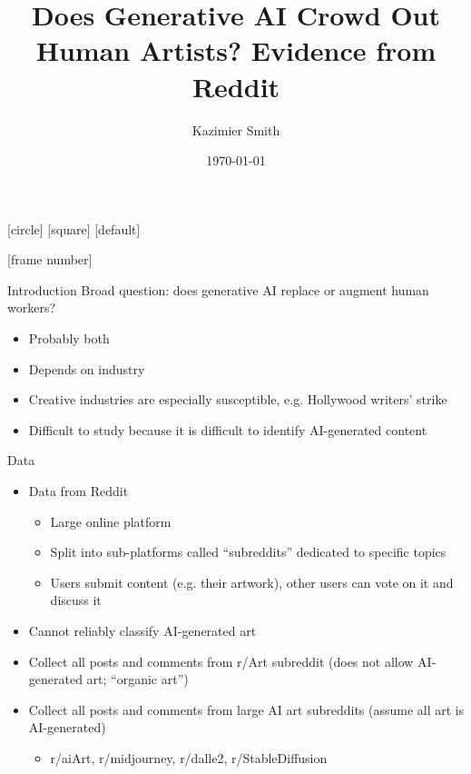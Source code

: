\documentclass[aspectratio=169]{beamer}
\title{Does Generative AI Crowd Out Human Artists? Evidence from Reddit}
\author{Kazimier Smith}
\date{\today}
\begin{document}
[circle]
[square]
[default]
\beamertemplatenavigationsymbolsempty

	
\begin{frame}[noframenumbering]
\titlepage
\end{frame}

[frame number]

\begin{frame}{Introduction}
Broad question: does generative AI replace or augment human workers?
	\begin{itemize}
		\item Probably both
		\item Depends on industry
		\item Creative industries are especially susceptible,
			e.g. Hollywood writers' strike
		\item Difficult to study because it is difficult to identify AI-generated content
	\end{itemize}
\end{frame}

\begin{frame}{Data}
	\begin{itemize}
		\item Data from Reddit
			\begin{itemize}
				\item Large online platform
				\item Split into sub-platforms called ``subreddits'' dedicated to specific topics
				\item Users submit content (e.g. their artwork),
					other users can vote on it and discuss it
			\end{itemize}
		\item Cannot reliably classify AI-generated art
		\item Collect all posts and comments from r/Art subreddit
			(does not allow AI-generated art; ``organic art'')
		\item Collect all posts and comments from large AI art subreddits
			(assume all art is AI-generated)
		\begin{itemize}
			\item r/aiArt, r/midjourney, r/dalle2, r/StableDiffusion
		\end{itemize}
	\end{itemize}
\end{frame}
\end{document}
